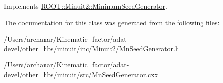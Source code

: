 Implements \mbox{\hyperlink{classROOT_1_1Minuit2_1_1MinimumSeedGenerator_a670b9671c73d7e0d3caa148e82d4b2fa}{R\+O\+O\+T\+::\+Minuit2\+::\+Minimum\+Seed\+Generator}}.



The documentation for this class was generated from the following files\+:\begin{DoxyCompactItemize}
\item 
/\+Users/archanar/\+Kinematic\+\_\+factor/adat-\/devel/other\+\_\+libs/minuit/inc/\+Minuit2/\mbox{\hyperlink{adat-devel_2other__libs_2minuit_2inc_2Minuit2_2MnSeedGenerator_8h}{Mn\+Seed\+Generator.\+h}}\item 
/\+Users/archanar/\+Kinematic\+\_\+factor/adat-\/devel/other\+\_\+libs/minuit/src/\mbox{\hyperlink{adat-devel_2other__libs_2minuit_2src_2MnSeedGenerator_8cxx}{Mn\+Seed\+Generator.\+cxx}}\end{DoxyCompactItemize}
